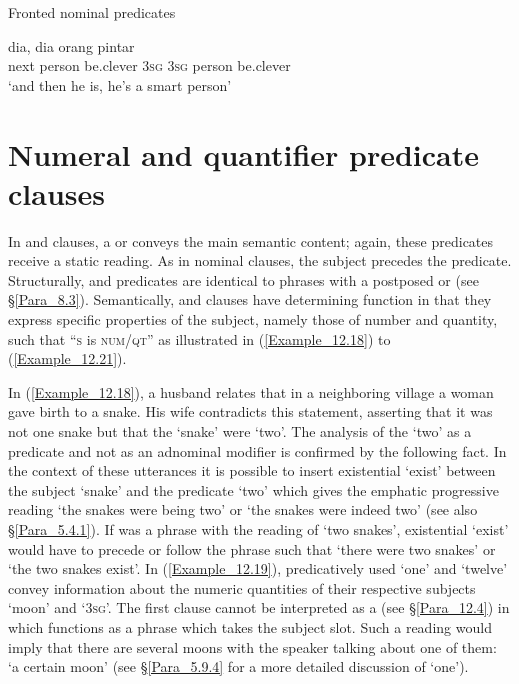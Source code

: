 \begin{styleExampleTitle}
Fronted nominal predicates
\end{styleExampleTitle}
\ea
\label{Example_12.17}
 {} {} {dia,} {dia} {orang} {pintar}\\ %
 next  person  be.clever  \textsc{3sg}  \textsc{3sg}  person  be.clever\\
\glt
‘and then  he is, he’s a smart person’ \textstyleExampleSource{[081029-005-Cv.0169]}
\z

\section{Numeral and {quantifier} predicate clauses}
\label{Para_12.3}
In  and  clauses, a  or  conveys the main semantic content; again, these predicates receive a static reading. As in nominal clauses, the subject precedes the predicate. Structurally,  and  predicates are identical to  phrases with a postposed  or  (see §\ref{Para_8.3}). Semantically,  and  clauses have determining function in that they express specific properties of the subject, namely those of number and quantity, such that ``\textsc{s} is \textsc{num}/\textsc{qt}'' as illustrated in (\ref{Example_12.18}) to (\ref{Example_12.21}).



In (\ref{Example_12.18}), a husband relates that in a neighboring village a woman gave birth to a snake. His wife contradicts this statement, asserting that it was not one snake but that the  ‘snake’ were  ‘two’. The analysis of the  ‘two’ as a  predicate and not as an adnominal modifier is confirmed by the following fact. In the context of these utterances it is possible to insert existential  ‘exist’ between the subject  ‘snake’ and the predicate  ‘two’ which gives the emphatic progressive reading  ‘the snakes were being two’ or ‘the snakes were indeed two’ (see also §\ref{Para_5.4.1}). If  was a  phrase with the reading of ‘two snakes’, existential  ‘exist’ would have to precede or follow the  phrase such that  ‘there were two snakes’ or  ‘the two snakes exist’. In (\ref{Example_12.19}), predicatively used  ‘one’ and  ‘twelve’ convey information about the numeric quantities of their respective subjects  ‘moon’ and  ‘3\textsc{sg}’. The first clause  cannot be interpreted as a  (see §\ref{Para_12.4}) in which  functions as a  phrase which takes the subject slot. Such a reading would imply that there are several moons with the speaker talking about one of them:  ‘a certain moon’ (see §\ref{Para_5.9.4} for a more detailed discussion of  ‘one’).


